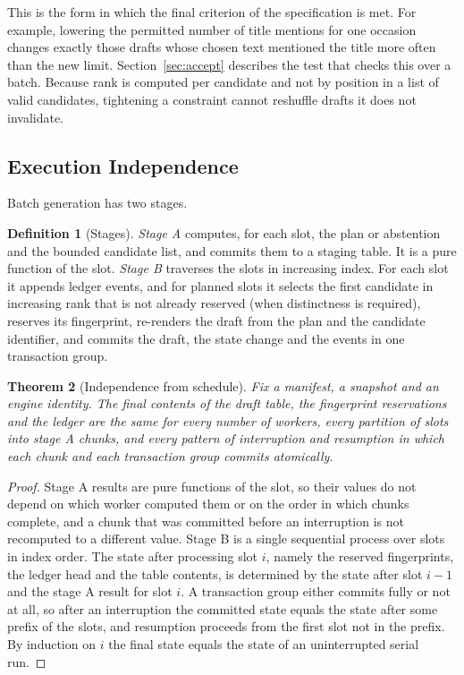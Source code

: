 \documentclass[11pt]{article}
\newtheorem{theorem}{Theorem}[section]
\theoremstyle{definition}
\newtheorem{definition}[theorem]{Definition}
\theoremstyle{remark}
\begin{document}
This is the form in which the final criterion of the specification is met. For example, lowering the permitted number of title mentions for one occasion changes exactly those drafts whose chosen text mentioned the title more often than the new limit. Section~\ref{sec:accept} describes the test that checks this over a batch. Because rank is computed per candidate and not by position in a list of valid candidates, tightening a constraint cannot reshuffle drafts it does not invalidate.

\subsection{Execution Independence}

Batch generation has two stages.

\begin{definition}[Stages]\label{def:stages}
\emph{Stage A} computes, for each slot, the plan or abstention and the bounded candidate list, and commits them to a staging table. It is a pure function of the slot. \emph{Stage B} traverses the slots in increasing index. For each slot it appends ledger events, and for planned slots it selects the first candidate in increasing rank that is not already reserved (when distinctness is required), reserves its fingerprint, re-renders the draft from the plan and the candidate identifier, and commits the draft, the state change and the events in one transaction group.
\end{definition}

\begin{theorem}[Independence from schedule]\label{thm:sched}
Fix a manifest, a snapshot and an engine identity. The final contents of the draft table, the fingerprint reservations and the ledger are the same for every number of workers, every partition of slots into stage A chunks, and every pattern of interruption and resumption in which each chunk and each transaction group commits atomically.
\end{theorem}
\begin{proof}
Stage A results are pure functions of the slot, so their values do not depend on which worker computed them or on the order in which chunks complete, and a chunk that was committed before an interruption is not recomputed to a different value. Stage B is a single sequential process over slots in index order. The state after processing slot $i$, namely the reserved fingerprints, the ledger head and the table contents, is determined by the state after slot $i-1$ and the stage A result for slot $i$. A transaction group either commits fully or not at all, so after an interruption the committed state equals the state after some prefix of the slots, and resumption proceeds from the first slot not in the prefix. By induction on $i$ the final state equals the state of an uninterrupted serial run.
\end{proof}
\end{document}
